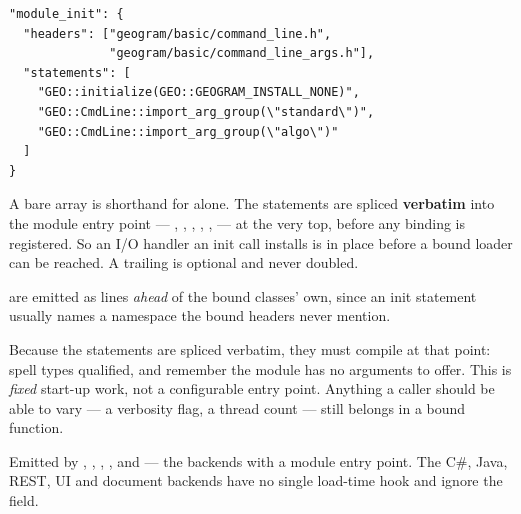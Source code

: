 \begin{lstlisting}[style=json]
"module_init": {
  "headers": ["geogram/basic/command_line.h",
              "geogram/basic/command_line_args.h"],
  "statements": [
    "GEO::initialize(GEO::GEOGRAM_INSTALL_NONE)",
    "GEO::CmdLine::import_arg_group(\"standard\")",
    "GEO::CmdLine::import_arg_group(\"algo\")"
  ]
}
\end{lstlisting}

A bare array is shorthand for  alone. The statements are
spliced \textbf{verbatim} into the module entry point ---
, , ,
, ,  --- at the
very top, before any binding is registered. So an I/O handler an init call
installs is in place before a bound loader can be reached. A trailing \code{;}
is optional and never doubled.

 are emitted as  lines \emph{ahead} of the bound
classes' own, since an init statement usually names a namespace the bound
headers never mention.

\begin{warn}
Because the statements are spliced verbatim, they must compile at that point:
spell types qualified, and remember the module has no arguments to offer. This
is \emph{fixed} start-up work, not a configurable entry point. Anything a caller
should be able to vary --- a verbosity flag, a thread count --- still belongs in
a bound function.
\end{warn}

Emitted by , , , , 
and  --- the backends with a module entry point. The C\#, Java,
REST, UI and document backends have no single load-time hook and ignore the
field.
